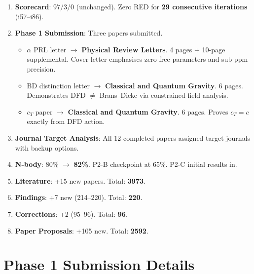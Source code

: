 \documentclass[11pt,a4paper]{article}
\begin{document}
\begin{tcolorbox}[colback=green!5!white, colframe=dfdgreen, title=\textbf{i86 Operational Results}]
\begin{enumerate}[nosep]
\item \textbf{Scorecard}: 97/3/0 (unchanged). Zero RED for \textbf{29 consecutive iterations} (i57--i86).

\item \textbf{Phase 1 Submission}: Three papers submitted.
\begin{itemize}[nosep]
\item $\alpha$ PRL letter $\to$ \textbf{Physical Review Letters}. 4 pages + 10-page supplemental. Cover letter emphasises zero free parameters and sub-ppm precision.
\item BD distinction letter $\to$ \textbf{Classical and Quantum Gravity}. 6 pages. Demonstrates DFD $\neq$ Brans--Dicke via constrained-field analysis.
\item $c_T$ paper $\to$ \textbf{Classical and Quantum Gravity}. 6 pages. Proves $c_T = c$ exactly from DFD action.
\end{itemize}

\item \textbf{Journal Target Analysis}: All 12 completed papers assigned target journals with backup options.

\item \textbf{N-body}: 80\% $\to$ \textbf{82\%}. P2-B checkpoint at 65\%. P2-C initial results in.

\item \textbf{Literature}: +15 new papers. Total: \textbf{3973}.

\item \textbf{Findings}: +7 new (214--220). Total: \textbf{220}.

\item \textbf{Corrections}: +2 (95--96). Total: \textbf{96}.

\item \textbf{Paper Proposals}: +105 new. Total: \textbf{2592}.
\end{enumerate}
\end{tcolorbox}

\section{Phase 1 Submission Details}
\end{document}

